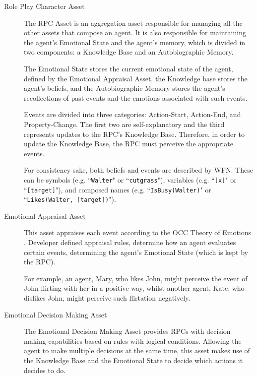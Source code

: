 \begin{description}
\item [Role Play Character Asset] \hfill

The \ac{RPC} Asset is an aggregation asset responsible for managing all the other assets that compose an agent.
It is also responsible for maintaining the agent's Emotional State and the agent's memory, which is divided in two components: a Knowledge Base and an Autobiographic Memory.

The Emotional State stores the current emotional state of the agent, defined by the Emotional Appraisal Asset, the Knowledge base stores the agent's beliefs, and the Autobiographic Memory stores the agent's recollections of past events and the emotions associated with such events.

Events are divided into three categories: Action-Start, Action-End, and Property-Change. The first two are self-explanatory and the third represents updates to the \ac{RPC}'s Knowledge Base.
Therefore, in order to update the Knowledge Base, the \ac{RPC} must perceive the appropriate events.

For consistency sake, both beliefs and events are described by \ac{WFN}.
These can be symbols (e.g. ``\texttt{Walter}" or ``\texttt{cutgrass}"), variables (e.g. ``\texttt{[x]}" or ``\texttt{[target]}"), and composed names (e.g. ``\texttt{IsBusy(Walter)}" or ``\texttt{Likes(Walter, [target])}").

\item [Emotional Appraisal Asset] \hfill

This asset appraises each event according to the OCC Theory of Emotions \cite{ortony:occ}.
Developer defined appraisal rules, determine how an agent evaluates certain events, determining the agent's Emotional State (which is kept by the \ac{RPC}).

For example, an agent, Mary, who likes John, might perceive the event of John flirting with her in a positive way, whilst another agent, Kate, who dislikes John, might perceive such flirtation negatively.

\item [Emotional Decision Making Asset] \hfill

The Emotional Decision Making Asset provides \acp{RPC} with decision making capabilities based on rules with logical conditions.
Allowing the agent to make multiple decisions at the same time, this asset makes use of the Knowledge Base and the Emotional State to decide which actions it decides to do.


\end{description}
